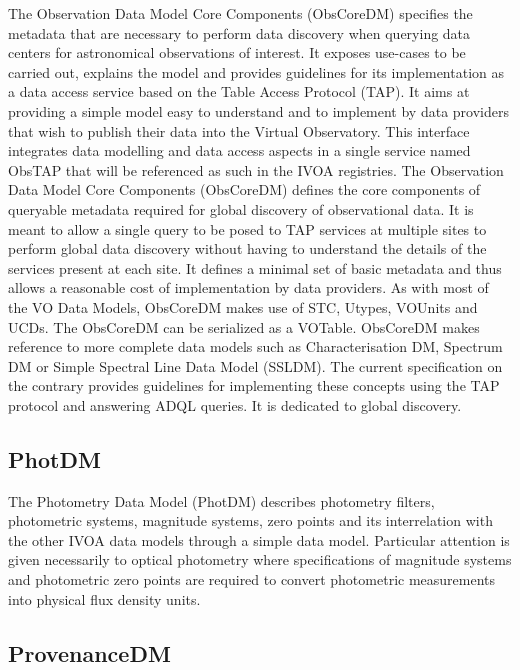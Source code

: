 \documentclass[11pt,letter]{ivoa}
\begin{document}
The Observation Data Model Core Components (ObsCoreDM)
\citep{2017ivoa.spec.0509L} specifies the metadata that are necessary to
perform data
discovery when querying data centers for astronomical observations of
interest. It exposes
use-cases to be carried out, explains the model and provides guidelines
for its implementation
as a data access service based on the Table Access Protocol (TAP). It
aims at providing a
simple model easy to understand and to implement by data providers that
wish to publish their
data into the Virtual Observatory. This interface integrates data
modelling and data access
aspects in a single service named ObsTAP that will be referenced as such
in the IVOA
registries. The Observation Data Model Core Components (ObsCoreDM)
defines
the core components of queryable metadata required for global discovery
of observational data.
It is meant to allow a single query to be posed to TAP services at
multiple sites to perform
global data discovery without having to understand the details of the
services present at each
site. It defines a minimal set of basic metadata and thus allows a
reasonable cost of
implementation by data providers. As with most of the VO Data Models,
ObsCoreDM makes use of STC, Utypes,
VOUnits and UCDs. The ObsCoreDM can be serialized as a VOTable.
ObsCoreDM makes reference
to more complete data models such as Characterisation DM, Spectrum DM or
Simple Spectral Line
Data Model (SSLDM). The current specification on the contrary provides
guidelines for
implementing these concepts using the TAP protocol and answering ADQL
queries. It is
dedicated to global discovery.

\subsection{PhotDM}

The Photometry Data Model (PhotDM) \citep{2022ivoa.spec.1101S} describes
photometry filters, photometric systems, magnitude
systems, zero points and its interrelation with the other IVOA data
models through a
simple data model. Particular attention is given necessarily to optical
photometry where
specifications of magnitude systems and photometric zero points are
required to convert
photometric measurements into physical flux density units.

\subsection{ProvenanceDM}
\end{document}
